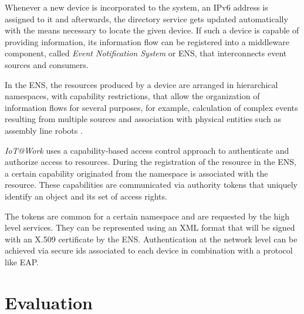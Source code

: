 \documentclass[journal]{IEEEtran}
\begin{document}
  Whenever a new device is incorporated to the system, an IPv6 address is assigned to it and afterwards, the directory service gets updated automatically with the means necessary to locate the given device. If such a device is capable of providing information, its information flow can be registered into a middleware component, called \emph{Event Notification System} or ENS, that interconnects event sources and consumers. 

  In the ENS, the resources produced by a device are arranged in hierarchical namespaces, with capability restrictions, that allow the organization of information flows for several purposes, for example, calculation of complex events resulting from multiple sources and association with physical entities such as assembly line robots \cite{Trsek2013}.

  \emph{IoT@Work} uses a capability-based access control approach to authenticate and authorize access to resources. During the registration of the resource in the ENS, a certain capability originated from the namespace is associated with the resource. These capabilities are communicated via authority tokens that uniquely identify an object and its set of access rights.

  The tokens are common for a certain namespace and are requested by the high level services. They can be represented using an XML format that will be signed with an X.509 certificate by the ENS. Authentication at the network level can be achieved via secure ids associated to each device in combination with a protocol like EAP.

\section{Evaluation}
  
\end{document}
